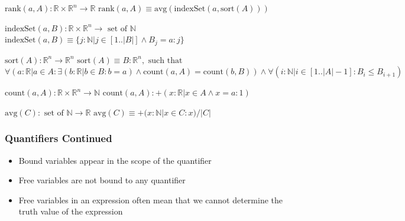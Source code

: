 \documentclass[t,12pt,numbers,fleqn]{beamer}
\begin{document}

\begin{frame}

\noindent $\mbox{rank}(a, A): \mathbb{R} \times \mathbb{R}^n \rightarrow \mathbb{R}$\newline
$\mbox{rank}(a, A) \equiv \mbox{avg}(\mbox{indexSet}(a, \mbox{sort}(A)))$\newline

\noindent $\mbox{indexSet}(a, B): \mathbb{R} \times \mathbb{R}^n \rightarrow \mbox{ set of }
\mathbb{N}$\newline
$\mbox{indexSet}(a, B) \equiv \{j: \mathbb{N} | j \in [1..|B|]
\wedge B_j = a : j \}$\newline

\noindent $\mbox{sort}(A): \mathbb{R}^n \rightarrow \mathbb{R}^n$\newline
$\mbox{sort}(A) \equiv B: \mathbb{R}^n, \mbox{ such that }$\newline
$\forall (a: \mathbb{R} | a \in A : \exists(b: \mathbb{R} | b \in B: b = a)
\wedge \mbox{count}(a, A) = \mbox{count}(b, B)) \wedge \forall (i: \mathbb{N} | i \in [1..|A|-1] : B_i \leq B_{i+1})$\newline

\noindent $\mbox{count}(a, A): \mathbb{R} \times \mathbb{R}^n \rightarrow \mathbb{N}$\newline
$\mbox{count}(a, A): + (x: \mathbb{R} | x \in A \wedge x = a : 1)$\newline

\noindent $\mbox{avg}(C): \mbox{ set of } \mathbb{N} \rightarrow \mathbb{R}$\newline
$\mbox{avg}(C) \equiv + (x: \mathbb{N} | x \in C : x) / |C|$\newline

\end{frame}


\begin{frame}
\frametitle{Quantifiers Continued}
\begin{itemize}
\item Bound variables appear in the scope of the quantifier
\item Free variables are not bound to any quantifier
\item Free variables in an expression often  mean that we cannot determine the truth value of the expression
\end{itemize}
\end{frame}
\end{document}
